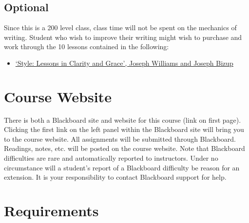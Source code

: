 \documentclass[article,oneside]{memoir}
\begin{document}
\subsection{Optional}
Since this is a 200 level class, class time will not be spent on the mechanics of writing. Student who wish to improve their writing might wish to purchase and work through the 10 lessons contained in the following: 
\begin{itemize}
\item \href{http://www.amazon.com/Style-Lessons-Clarity-Grace-11th/dp/0321898680/ref=sr_1_1?ie=UTF8&qid=1452356026&sr=8-1&keywords=lessons+in+clarity+and+grace}{`Style: Lessons in Clarity and Grace', Joseph Williams and Joseph Bizup}
\end{itemize}
\section{Course Website}
There is both a Blackboard site and website for this course (link on first page). Clicking the first link on the left panel within the Blackboard site will bring you to the course website. All assignments will be submitted through Blackboard. Readings, notes, etc. will be posted on the course website. Note that Blackboard difficulties are rare and automatically reported to instructors. Under no circumstance will a student's report of a Blackboard difficulty be reason for an extension. It is your responsibility to contact Blackboard support for help.


\section{Requirements}
\end{document}
